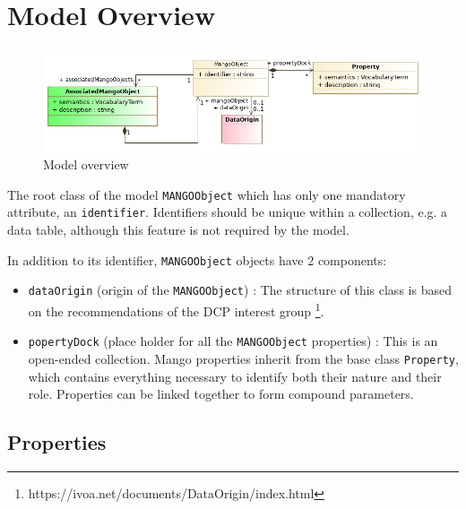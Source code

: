 \documentclass[11pt,a4paper]{ivoa}
\begin{document}
\section{Model Overview}

\begin{figure}
     \includegraphics[width=1.0\textwidth]{../model/overview.png}
     \caption{Model overview}
     \label{overview}
\end{figure}

The root class of the model \texttt{MANGOObject} which has only
one mandatory attribute, an \texttt{identifier}.
Identifiers should be unique within a collection, e.g. a data table, although 
this feature is not required by the model.

In addition to its identifier, \texttt{MANGOObject} objects have 2 components:

\begin{itemize}[noitemsep,topsep=0pt,parsep=0pt,partopsep=0pt]

  \item \texttt{dataOrigin} (origin of the \texttt{MANGOObject}) : The structure of this class is based on
        the recommendations of the DCP interest group \footnote{https://ivoa.net/documents/DataOrigin/index.html}.
  \item \texttt{popertyDock} (place holder for all the \texttt{MANGOObject} properties) :
        This is an open-ended collection.
        Mango properties inherit from the base class \texttt{Property},
        which contains everything necessary to identify both their nature and their role.
        Properties can be linked together to form compound parameters.
\end{itemize}


\subsection{Properties}
\end{document}
